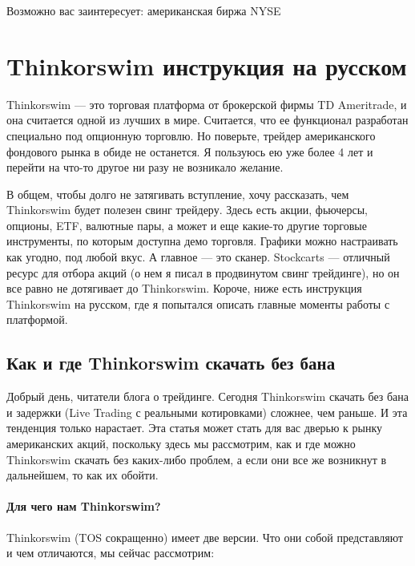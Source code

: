 \documentclass[a5paper]{article}
\begin{document}
Возможно вас заинтересует: американская биржа NYSE


\section{Thinkorswim инструкция на русском}

Thinkorswim — это торговая платформа от брокерской фирмы TD Ameritrade, и она считается одной из лучших в мире. Считается, что ее функционал разработан специально под опционную торговлю. Но поверьте, трейдер американского фондового рынка в обиде не останется. Я пользуюсь ею уже более 4 лет и перейти на что-то другое ни разу не возникало желание.

В общем, чтобы долго не затягивать вступление, хочу рассказать, чем
Thinkorswim будет полезен свинг трейдеру. Здесь есть акции, фьючерсы,
опционы, ETF, валютные пары, а может и еще какие-то другие торговые
инструменты, по которым доступна демо торговля. Графики можно
настраивать как угодно, под любой вкус. А главное — это
сканер. Stockcarts — отличный ресурс для отбора акций (о нем я писал в
продвинутом свинг трейдинге), но он все равно не дотягивает до
Thinkorswim. Короче, ниже есть инструкция Thinkorswim на русском, где
я попытался описать главные моменты работы с платформой.

\subsection{Как и где Thinkorswim скачать без бана}

Добрый день, читатели блога о трейдинге. Сегодня Thinkorswim скачать без бана и задержки (Live Trading с реальными котировками) сложнее, чем раньше. И эта тенденция только нарастает. Эта статья может стать для вас дверью к рынку американских акций, поскольку здесь мы рассмотрим, как и где можно Thinkorswim скачать без каких-либо проблем, а если они все же возникнут в дальнейшем, то как их обойти.

\paragraph{Для чего нам Thinkorswim?}

Thinkorswim (TOS сокращенно) имеет две версии. Что они собой представляют и чем отличаются, мы сейчас рассмотрим:
\end{document}
